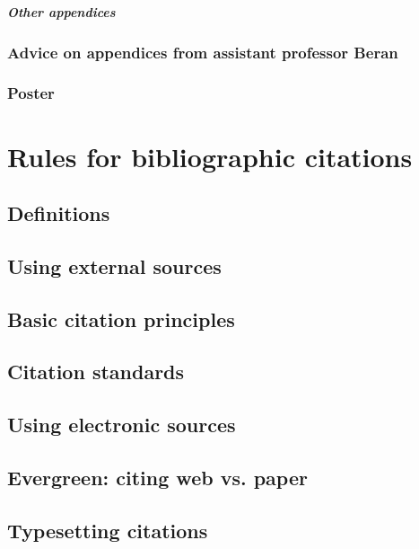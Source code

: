 \paragraph{Other appendices}

\subsection*{Advice on appendices from assistant professor Beran}


\subsection*{Poster}

\chapter{Rules for bibliographic citations}
\label{citace}

\section{Definitions}

\section{Using external sources}

\section{Basic citation principles}

\section{Citation standards}

\section{Using electronic sources}

\section{Evergreen: citing web vs. paper}

\section{Typesetting citations}

